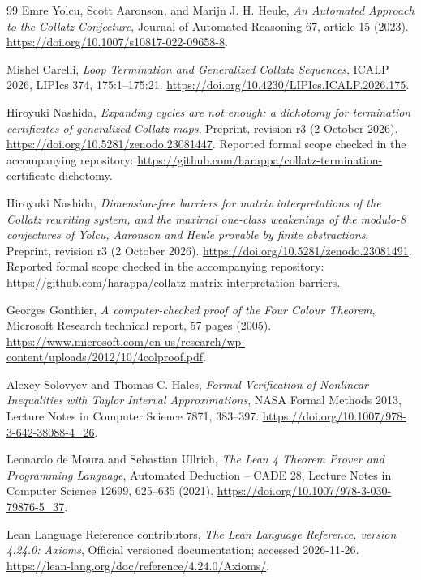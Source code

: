 \begin{thebibliography}{99}
Emre Yolcu, Scott Aaronson, and Marijn J. H. Heule,
\emph{An Automated Approach to the Collatz Conjecture},
Journal of Automated Reasoning 67, article 15 (2023).
\url{https://doi.org/10.1007/s10817-022-09658-8}.

Mishel Carelli,
\emph{Loop Termination and Generalized Collatz Sequences},
ICALP 2026, LIPIcs 374, 175:1--175:21.
\url{https://doi.org/10.4230/LIPIcs.ICALP.2026.175}.

Hiroyuki Nashida,
\emph{Expanding cycles are not enough: a dichotomy for termination certificates of generalized Collatz maps},
Preprint, revision r3 (2 October 2026).
\url{https://doi.org/10.5281/zenodo.23081447}.
Reported formal scope checked in the accompanying repository:
\url{https://github.com/harappa/collatz-termination-certificate-dichotomy}.

Hiroyuki Nashida,
\emph{Dimension-free barriers for matrix interpretations of the Collatz rewriting system, and the maximal one-class weakenings of the modulo-8 conjectures of Yolcu, Aaronson and Heule provable by finite abstractions},
Preprint, revision r3 (2 October 2026).
\url{https://doi.org/10.5281/zenodo.23081491}.
Reported formal scope checked in the accompanying repository:
\url{https://github.com/harappa/collatz-matrix-interpretation-barriers}.

Georges Gonthier,
\emph{A computer-checked proof of the Four Colour Theorem},
Microsoft Research technical report, 57 pages (2005).
\url{https://www.microsoft.com/en-us/research/wp-content/uploads/2012/10/4colproof.pdf}.

Alexey Solovyev and Thomas C. Hales,
\emph{Formal Verification of Nonlinear Inequalities with Taylor Interval Approximations},
NASA Formal Methods 2013, Lecture Notes in Computer Science 7871, 383--397.
\url{https://doi.org/10.1007/978-3-642-38088-4_26}.

Leonardo de Moura and Sebastian Ullrich,
\emph{The Lean 4 Theorem Prover and Programming Language},
Automated Deduction -- CADE 28, Lecture Notes in Computer Science 12699, 625--635 (2021).
\url{https://doi.org/10.1007/978-3-030-79876-5_37}.

Lean Language Reference contributors,
\emph{The Lean Language Reference, version 4.24.0: Axioms},
Official versioned documentation; accessed 2026-11-26.
\url{https://lean-lang.org/doc/reference/4.24.0/Axioms/}.


\end{thebibliography}
